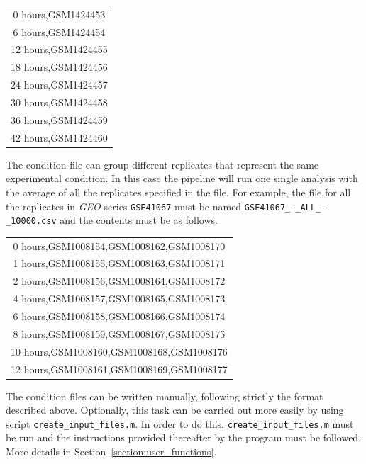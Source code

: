 \documentclass[final,letterpaper,12pt]{article}
\begin{document}
\begin{center}
\begin{tabular}{ c }

0 hours,GSM1424453 \\
6 hours,GSM1424454 \\
12 hours,GSM1424455 \\
18 hours,GSM1424456 \\
24 hours,GSM1424457 \\
30 hours,GSM1424458 \\
36 hours,GSM1424459 \\
42 hours,GSM1424460 \\

\end{tabular}
\end{center}

\par The condition file can group different replicates that represent the same experimental condition. In this case the pipeline will run one single analysis with the average of all the replicates specified in the file. For example, the file for all the replicates in \textit{GEO} series \texttt{GSE41067} must be named \texttt{GSE41067\_-\_ALL\_-\_10000.csv} and the contents must be as follows.

\begin{center}
\begin{tabular}{ c }

0 hours,GSM1008154,GSM1008162,GSM1008170 \\
1 hours,GSM1008155,GSM1008163,GSM1008171 \\
2 hours,GSM1008156,GSM1008164,GSM1008172 \\
4 hours,GSM1008157,GSM1008165,GSM1008173 \\
6 hours,GSM1008158,GSM1008166,GSM1008174 \\
8 hours,GSM1008159,GSM1008167,GSM1008175 \\
10 hours,GSM1008160,GSM1008168,GSM1008176 \\
12 hours,GSM1008161,GSM1008169,GSM1008177 \\


\end{tabular}
\end{center}

\par The condition files can be written manually, following strictly the format described above. Optionally, this task can be carried out more easily by using script \texttt{create\_input\_files.m}. In order to do this, \texttt{create\_input\_files.m} must be run and the instructions provided thereafter by the program must be followed. More details in Section~\ref{section:user_functions}.
\end{document}
